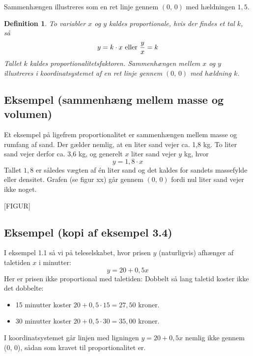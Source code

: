 \documentclass[12pt,oneside,a4paper]{article}
\newtheorem{mydef}[thm]{Definition}
\begin{document}
Sammenhængen illustreres som en ret linje gennem $(0,\,0)$ med hældningen $1,5$.

\begin{mydef}
    To variabler $x$ og $y$ kaldes proportionale, hvis der findes et tal $k$, så
    $$
    y = k\cdot x \,\, {\rm eller} \,\, \frac{y}{x} = k
    $$
    Tallet $k$ kaldes proportionalitetsfaktoren. Sammenhængen mellem $x$ og $y$
    illustreres i koordinatsystemet af en ret linje gennem $(0,\,0)$ med 
    hældning $k$.
\end{mydef}

\subsection{Eksempel (sammenhæng mellem masse og volumen)}

Et eksempel på ligefrem proportionalitet er sammenhængen mellem masse og rumfang af sand.
Der gælder nemlig, at en liter sand vejer ca. 1,8 kg. To liter sand vejer derfor ca. 3,6 kg,
og generelt $x$ liter sand vejer $y$ kg, hvor
$$
y = 1,8 \cdot x
$$
Tallet $1,8$ er således vægten af én liter sand og det kaldes for sandets massefylde eller densitet.
Grafen (se figur xx) går gennem $(0,\,0)$ fordi nul liter sand vejer ikke noget.

[FIGUR]

\subsection{Eksempel (kopi af eksempel 3.4)}
I eksempel 1.1 så vi på teleselskabet, hvor prisen $y$ (naturligvis) afhænger af
taletiden $x$ i minutter:
$$
y=20+0,5x
$$
Her er prisen ikke proportional med taletiden: Dobbelt så lang taletid koster ikke
det dobbelte:
\begin{itemize}
    \item 15 minutter koster $20+0,5\cdot 15 = 27,50$ kroner.
    \item 30 minutter koster $20+0,5\cdot 30 = 35,00$ kroner.
\end{itemize}
I koordinatsystemet går linjen med ligningen $y=20+0,5x$ nemlig ikke gennem (0, 0),
sådan som kravet til proportionalitet er.
\end{document}
